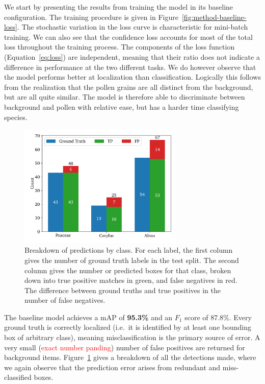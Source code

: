 We start by presenting the results from training the model in its baseline configuration. 
The training procedure is given in Figure~\ref{fig:method-baseline-loss}. The stochastic variation in the loss curve is characteristic for mini-batch training. 
We can also see that the confidence loss accounts for most of the total loss throughout the training process.
The components of the loss function (Equation~\ref{eq:loss}) are independent, meaning that their ratio does not indicate a difference in performance at the two different tasks.
We do however observe that the model performs better at localization than classification. Logically this follows from the realization that the pollen grains are all distinct from the background, but are all quite similar.
The model is therefore able to discriminate between background and pollen with relative ease, but has a harder time classifying species.

\begin{figure}[htb]
    \centering
    \includegraphics[width=0.7\textwidth]{figs/method/baseline/detections_test.pdf}
    \caption[Detections by type by class for the baseline on the test split]{%
Breakdown of predictions by class. For each label, the first column gives the number of ground truth labels in the test split.
The second column gives the number or predicted boxes for that class, broken down into true positive matches in green, and false negatives in red.
The difference between ground truths and true positives in the number of false negatives. 
    }\label{fig:method-baseline-detections}
  \end{figure}

The baseline model achieves a mAP of \textbf{95.3\%} and an \(F_1\) score of 87.8\%.
Every ground truth is correctly localized (i.e.~it is identified by at least one bounding box of arbitrary class), meaning misclassification is the primary source of error.
A very small (\textcolor{red}{exact number panding}) number of false positives are returned for background items.
Figure~\ref{fig:method-baseline-detections} gives a breakdown of all the detections made, where we again observe that the prediction error arises from redundant and miss-classified boxes.

